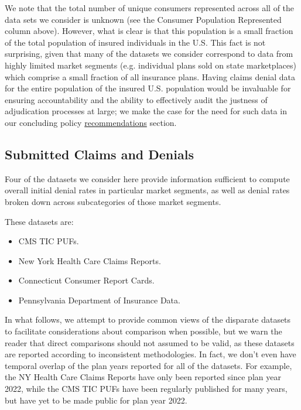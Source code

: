 \documentclass[12pt, a4paper,twoside,parskip=full]{report}
\theoremstyle{plain} %
\theoremstyle{definition} %
\theoremstyle{remark} %
\numberwithin{equation}{chapter}
\begin{document}
		We note that the total number of unique consumers represented across all of the data sets we consider is unknown (see the Consumer Population Represented column above). However, what is clear is that this population is a small fraction of the total population of insured individuals in the U.S. This fact is not surprising, given that many of the datasets we consider correspond to data from highly limited market segments (e.g. individual plans sold on state marketplaces) which comprise a small fraction of all insurance plans. Having claims denial data for the entire population of the insured U.S. population would be invaluable for ensuring accountability and the ability to effectively audit the justness of adjudication processes at large; we make the case for the need for such data in our concluding policy \hyperref[recommendations]{recommendations} section.
		
		\subsection{Submitted Claims and Denials}\label{publicdata:claimsanddenials}
		
		Four of the datasets we consider here provide information sufficient to compute overall initial denial rates in particular market segments, as well as denial rates broken down across subcategories of those market segments.
		
		These datasets are:
		
		\begin{itemize}
			\item CMS TIC PUFs.
			\item New York Health Care Claims Reports.
			\item Connecticut Consumer Report Cards.
			\item Pennsylvania Department of Insurance Data.
		\end{itemize}
		
		In what follows, we attempt to provide common views of the disparate datasets to facilitate considerations about comparison when possible, but we warn the reader that direct comparisons should not assumed to be valid, as these datasets are reported according to inconsistent methodologies. In fact, we don't even have temporal overlap of the plan years reported for all of the datasets. For example, the NY Health Care Claims Reports have only been reported since plan year 2022, while the CMS TIC PUFs have been regularly published for many years, but have yet to be made public for plan year 2022.
		
\end{document}
